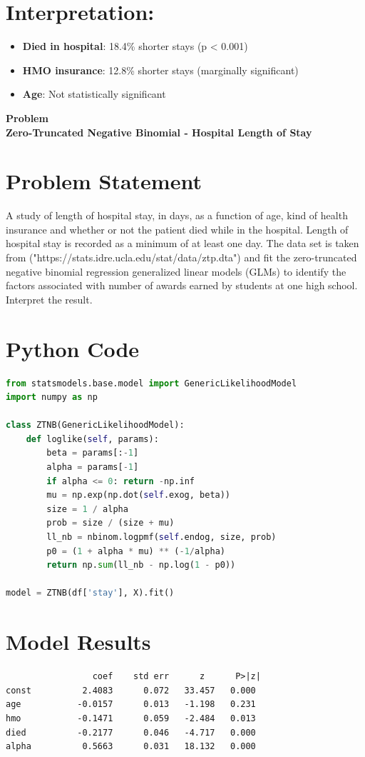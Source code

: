 \documentclass[12pt, a4paper]{article}
\newcounter{problemcounter}
\newcommand{\problemtitle}[1]{%
    \vspace{0.5cm}
    \begin{center}
        \colorbox{DeepGold!20}{\parbox{0.85\textwidth}{\centering
            {\color{RoyalNavy}\Huge\bfseries Problem \arabic{problemcounter}}\\[0.2cm]
            {\color{Charcoal}\large\bfseries #1}
        }}
    \end{center}
    \stepcounter{problemcounter}
    \vspace{0.3cm}
}
\begin{document}
\section*{Interpretation:}
\begin{itemize}
    \item \textbf{Died in hospital}: 18.4\% shorter stays (p < 0.001)
    \item \textbf{HMO insurance}: 12.8\% shorter stays (marginally significant)
    \item \textbf{Age}: Not statistically significant
\end{itemize}

\newpage
\problemtitle{Zero-Truncated Negative Binomial - Hospital Length of Stay}
\section{Problem Statement}A study of length of hospital stay, in days, as a function of age, kind of health insurance and whether or not the patient died while in the hospital. Length of hospital stay is recorded as a minimum of at least one day. The data set is taken from ("https://stats.idre.ucla.edu/stat/data/ztp.dta") and fit the zero-truncated negative binomial regression generalized linear models (GLMs) to identify the factors associated with number of awards earned by students at one high school. Interpret the result.
\section*{Python Code}
\begin{lstlisting}[language=Python]
from statsmodels.base.model import GenericLikelihoodModel
import numpy as np

class ZTNB(GenericLikelihoodModel):
    def loglike(self, params):
        beta = params[:-1]
        alpha = params[-1]
        if alpha <= 0: return -np.inf
        mu = np.exp(np.dot(self.exog, beta))
        size = 1 / alpha
        prob = size / (size + mu)
        ll_nb = nbinom.logpmf(self.endog, size, prob)
        p0 = (1 + alpha * mu) ** (-1/alpha)
        return np.sum(ll_nb - np.log(1 - p0))

model = ZTNB(df['stay'], X).fit()
\end{lstlisting}

\section*{Model Results}
\begin{outputbox}
\begin{verbatim}
                 coef    std err      z      P>|z|
const          2.4083      0.072   33.457   0.000
age           -0.0157      0.013   -1.198   0.231
hmo           -0.1471      0.059   -2.484   0.013
died          -0.2177      0.046   -4.717   0.000
alpha          0.5663      0.031   18.132   0.000
\end{verbatim}
\end{outputbox}
\end{document}
